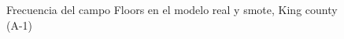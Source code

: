 \begin{figure}[H]
    \centering
    
    \caption{Frecuencia del campo Floors en el modelo real y smote, King county (A-1)}
    \label{frecuency-smote-floors}
\end{figure}